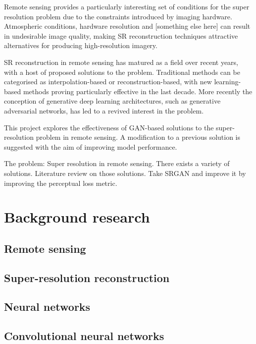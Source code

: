 Remote sensing provides a particularly interesting set of conditions for the super resolution problem due to the constraints introduced by imaging hardware. Atmospheric conditions, hardware resolution and [something else here] can result in undesirable image quality, making SR reconstruction techniques attractive alternatives for producing high-resolution imagery.

SR reconstruction in remote sensing has matured as a field over recent years, with a host of proposed solutions to the problem. Traditional methods can be categorised as interpolation-based or reconstruction-based, with new learning-based methods proving particularly effective in the last decade. More recently the conception of generative deep learning architectures, such as generative adversarial networks, has led to a revived interest in the problem.

This project explores the effectiveness of GAN-based solutions to the super-resolution problem in remote sensing. A modification to a previous solution is suggested with the aim of improving model performance.

The problem: Super resolution in remote sensing. There exists a variety of solutions. Literature review on those solutions. Take SRGAN and improve it by improving the perceptual loss metric.

\section{Background research}\label{sec:background_research}

\subsection{Remote sensing}

\subsection{Super-resolution reconstruction}

\subsection{Neural networks}

\subsection{Convolutional neural networks}

